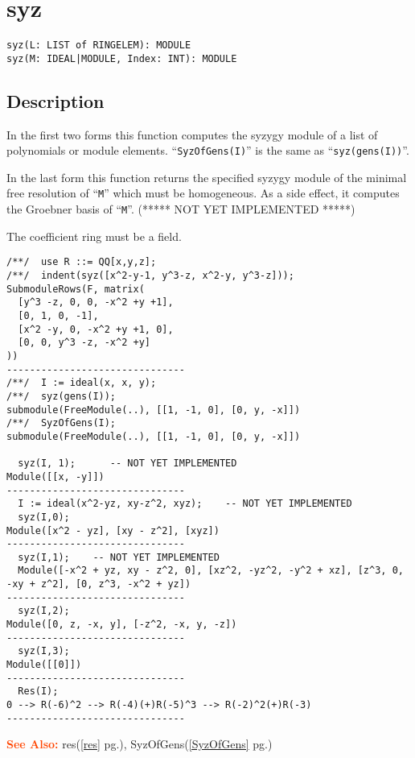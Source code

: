 \documentclass[a4paper]{mybook}
\newenvironment{command}{}{} %
\newcommand\SeeAlso{\par\textcolor{OrangeRed}{\textbf{\large See Also: }}}
\begin{document}
\section{syz}
\label{syz}
\begin{command} %


\begin{Verbatim}[label=syntax, rulecolor=\color{MidnightBlue},
frame=single]
syz(L: LIST of RINGELEM): MODULE
syz(M: IDEAL|MODULE, Index: INT): MODULE
\end{Verbatim}


\subsection*{Description}

In the first two forms this function computes the syzygy module of a list
of polynomials or module elements.
``\verb&SyzOfGens(I)&'' is the same as ``\verb&syz(gens(I))&''.
\par 
In the last form this function returns the specified syzygy module of
the minimal free resolution of ``\verb&M&'' which must be homogeneous.  As a side
effect, it computes the Groebner basis of ``\verb&M&''.   (***** NOT YET IMPLEMENTED *****)
\par 
The coefficient ring must be a field.
\begin{Verbatim}[label=example, rulecolor=\color{PineGreen}, frame=single]
/**/  use R ::= QQ[x,y,z];
/**/  indent(syz([x^2-y-1, y^3-z, x^2-y, y^3-z]));
SubmoduleRows(F, matrix(
  [y^3 -z, 0, 0, -x^2 +y +1],
  [0, 1, 0, -1],
  [x^2 -y, 0, -x^2 +y +1, 0],
  [0, 0, y^3 -z, -x^2 +y]
))
-------------------------------
/**/  I := ideal(x, x, y);
/**/  syz(gens(I));
submodule(FreeModule(..), [[1, -1, 0], [0, y, -x]])
/**/  SyzOfGens(I);
submodule(FreeModule(..), [[1, -1, 0], [0, y, -x]])

  syz(I, 1);      -- NOT YET IMPLEMENTED
Module([[x, -y]])
-------------------------------
  I := ideal(x^2-yz, xy-z^2, xyz);    -- NOT YET IMPLEMENTED
  syz(I,0);
Module([x^2 - yz], [xy - z^2], [xyz])
-------------------------------
  syz(I,1);    -- NOT YET IMPLEMENTED
  Module([-x^2 + yz, xy - z^2, 0], [xz^2, -yz^2, -y^2 + xz], [z^3, 0,
-xy + z^2], [0, z^3, -x^2 + yz])
-------------------------------
  syz(I,2);
Module([0, z, -x, y], [-z^2, -x, y, -z])
-------------------------------
  syz(I,3);
Module([[0]])
-------------------------------
  Res(I);
0 --> R(-6)^2 --> R(-4)(+)R(-5)^3 --> R(-2)^2(+)R(-3)
-------------------------------
\end{Verbatim}


\SeeAlso %
  res(\ref{res} pg.\pageref{res}), 
    SyzOfGens(\ref{SyzOfGens} pg.\pageref{SyzOfGens})
\end{command} %
\end{document}

